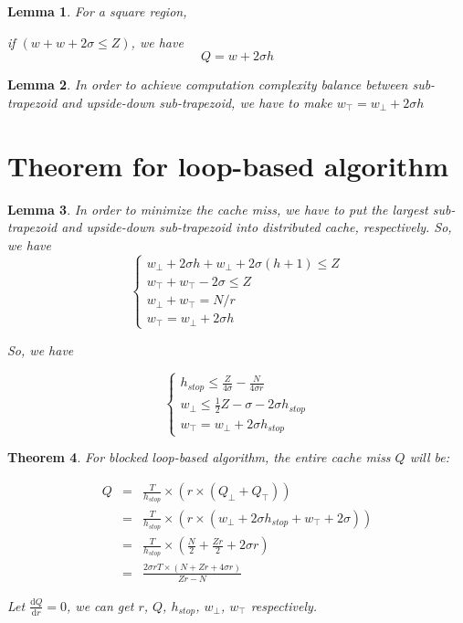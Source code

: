 \documentclass[10pt]{article}
\newtheorem{theorem}{Theorem}[section]
\newtheorem{lemma}[theorem]{Lemma}
\begin{document}
\begin{lemma} \label{lemma:Square}
For a square region,

if $(w + w + 2 \sigma \le Z)$, we have
\begin{equation}
Q = w + 2 \sigma h
\end{equation}
\end{lemma}

\begin{lemma} \label{lemma:ComputeBalance}
In order to achieve computation complexity balance between sub-trapezoid and upside-down sub-trapezoid, we have to make $w_{\top} = w_{\bot} + 2 \sigma h$
\end{lemma}

\section*{Theorem for loop-based algorithm}

\begin{lemma} \label{lemma:LoopConstraints}
In order to minimize the cache miss, we have to put the largest sub-trapezoid and upside-down sub-trapezoid into distributed cache, respectively. So, we have
\begin{equation}
\left\lbrace
\begin{array}{l}
w_{\bot} + 2 \sigma h + w_{\bot} + 2 \sigma (h+1) \le Z \\
w_{\top} + w_{\top} - 2 \sigma \le Z \\
w_{\bot} + w_{\top} = N/r \\
w_{\top} = w_{\bot} + 2 \sigma h
\end{array}
\right.
\end{equation}

So, we have

\begin{equation}
\left\lbrace
\begin{array}{l}
h_{stop} \le \frac{Z}{4 \sigma} - \frac{N}{4 \sigma r} \\
w_{\bot} \le \frac{1}{2} Z - \sigma - 2 \sigma h_{stop} \\
w_{\top} = w_{\bot} + 2 \sigma h_{stop}
\end{array}
\right.
\end{equation}
\end{lemma}

\begin{theorem}
For blocked loop-based algorithm, the entire cache miss $Q$ will be:

\begin{eqnarray}
Q & = & \frac{T}{h_{stop}} \times (r \times (Q_{\bot} + Q_{\top})) \\
  & = & \frac{T}{h_{stop}} \times (r \times (w_{\bot} + 2 \sigma h_{stop} + w_{\top} + 2 \sigma)) \\
  & = & \frac{T}{h_{stop}} \times (\frac{N}{2} + \frac{Z r}{2} + 2 \sigma r) \\
  & = & \frac{2 \sigma r T \times (N + Z r + 4 \sigma r)}{Z r - N}
\end{eqnarray}

Let $\frac{\mathrm{d} Q}{\mathrm{d} r} = 0$, we can get $r$, $Q$, $h_{stop}$, $w_{\bot}$, $w_{\top}$ respectively.
\end{theorem}
\end{document}
